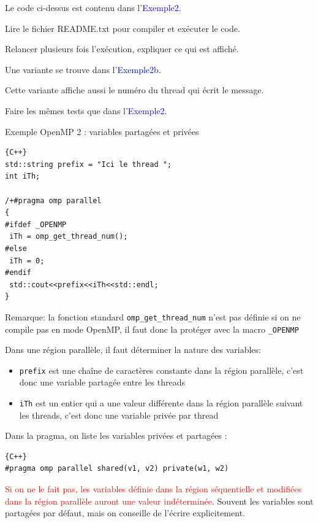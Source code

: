 \documentclass{beamer}
\begin{document}
\begin{frame}
Le code ci-dessus est contenu dans l'\textcolor{blue}{Exemple2}.

Lire le fichier README.txt pour compiler et exécuter le code.

\bigskip
Relancer plusieurs fois l'exécution, expliquer ce qui est affiché.

\vfill
Une variante se trouve dans l'\textcolor{blue}{Exemple2b}.

Cette variante affiche aussi le numéro du thread qui écrit le message.

Faire les mêmes tests que dans l'\textcolor{blue}{Exemple2}.
\end{frame}

\begin{frame}[fragile]
	Exemple OpenMP 2 : variables partagées et privées
	\vfill
	

\begin{lstlisting}{C++}
std::string prefix = "Ici le thread ";
int iTh;

/+#pragma omp parallel
{
#ifdef _OPENMP
 iTh = omp_get_thread_num();
#else
 iTh = 0;
#endif
 std::cout<<prefix<<iTh<<std::endl;
}
\end{lstlisting}

\vfill
Remarque: la fonction standard \verb|omp_get_thread_num| n'est pas définie si on ne compile pas en mode OpenMP, il faut donc la protéger avec la macro \verb|_OPENMP|
\end{frame}

\begin{frame}[fragile]

	Dans une région parallèle, il faut déterminer la nature des variables:

\begin{itemize}
	\item \verb|prefix| est une chaîne de caractères constante dans la région parallèle, c'est donc une variable partagée entre les threads
	\item \verb|iTh| est un entier qui a une valeur différente dans la région parallèle suivant les threads, c'est donc une variable privée par thread
\end{itemize}

\vfill
Dans la pragma, on liste les variables privées et partagées : 

{\small
\begin{lstlisting}{C++}
#pragma omp parallel shared(v1, v2) private(w1, w2)
\end{lstlisting}
}
\vfill
\textcolor{red}{Si on ne le fait pas, les variables définie dans la région séquentielle et modifiées dans la région parallèle auront une valeur indéterminée}.
\vfill
Souvent les variables sont partagées par défaut, mais on conseille de l'écrire explicitement.
\end{frame}
\end{document}
